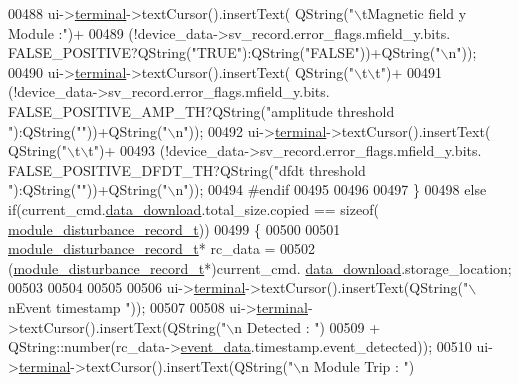 \begin{DoxyCode}
00488        ui->\hyperlink{a00027_aae71c46ea4546df5994735dee573b2dd}{terminal}->textCursor().insertText( QString(\textcolor{stringliteral}{"\(\backslash\)tMagnetic field y Module :"})+
00489                                             (!device\_data->sv\_record.error\_flags.mfield\_y.bits.
      FALSE\_POSITIVE?QString(\textcolor{stringliteral}{"TRUE"}):QString(\textcolor{stringliteral}{"FALSE"}))+QString(\textcolor{stringliteral}{"\(\backslash\)n"}));
00490        ui->\hyperlink{a00027_aae71c46ea4546df5994735dee573b2dd}{terminal}->textCursor().insertText( QString(\textcolor{stringliteral}{"\(\backslash\)t\(\backslash\)t"})+
00491                                             (!device\_data->sv\_record.error\_flags.mfield\_y.bits.
      FALSE\_POSITIVE\_AMP\_TH?QString(\textcolor{stringliteral}{"amplitude threshold "}):QString(\textcolor{stringliteral}{""}))+QString(\textcolor{stringliteral}{"\(\backslash\)n"}));
00492        ui->\hyperlink{a00027_aae71c46ea4546df5994735dee573b2dd}{terminal}->textCursor().insertText( QString(\textcolor{stringliteral}{"\(\backslash\)t\(\backslash\)t"})+
00493                                             (!device\_data->sv\_record.error\_flags.mfield\_y.bits.
      FALSE\_POSITIVE\_DFDT\_TH?QString(\textcolor{stringliteral}{"dfdt threshold "}):QString(\textcolor{stringliteral}{""}))+QString(\textcolor{stringliteral}{"\(\backslash\)n"}));
00494 \textcolor{preprocessor}{#endif}
00495 
00496 
00497     \}
00498     \textcolor{keywordflow}{else} \textcolor{keywordflow}{if}(current\_cmd.\hyperlink{a00001_a5cfeaed4d4f8e51070a324c0ba893ebe}{data\_download}.total\_size.copied == \textcolor{keyword}{sizeof}(
      \hyperlink{a00008}{module\_disturbance\_record\_t}))
00499     \{
00500         
00501         \hyperlink{a00008}{module\_disturbance\_record\_t}* rc\_data = 
00502                 (\hyperlink{a00008}{module\_disturbance\_record\_t}*)current\_cmd.
      \hyperlink{a00001_a5cfeaed4d4f8e51070a324c0ba893ebe}{data\_download}.storage\_location;
00503 
00504 
00505 
00506         ui->\hyperlink{a00027_aae71c46ea4546df5994735dee573b2dd}{terminal}->textCursor().insertText(QString(\textcolor{stringliteral}{"\(\backslash\)nEvent timestamp "}));
00507 
00508         ui->\hyperlink{a00027_aae71c46ea4546df5994735dee573b2dd}{terminal}->textCursor().insertText(QString(\textcolor{stringliteral}{"\(\backslash\)n      Detected   : "})
00509                            + QString::number(rc\_data->\hyperlink{a00008_a5a700ec4c240f4e86c5fb61aef8d983e}{event\_data}.timestamp.event\_detected));
00510         ui->\hyperlink{a00027_aae71c46ea4546df5994735dee573b2dd}{terminal}->textCursor().insertText(QString(\textcolor{stringliteral}{"\(\backslash\)n      Module Trip  : "})

\end{DoxyCode}

